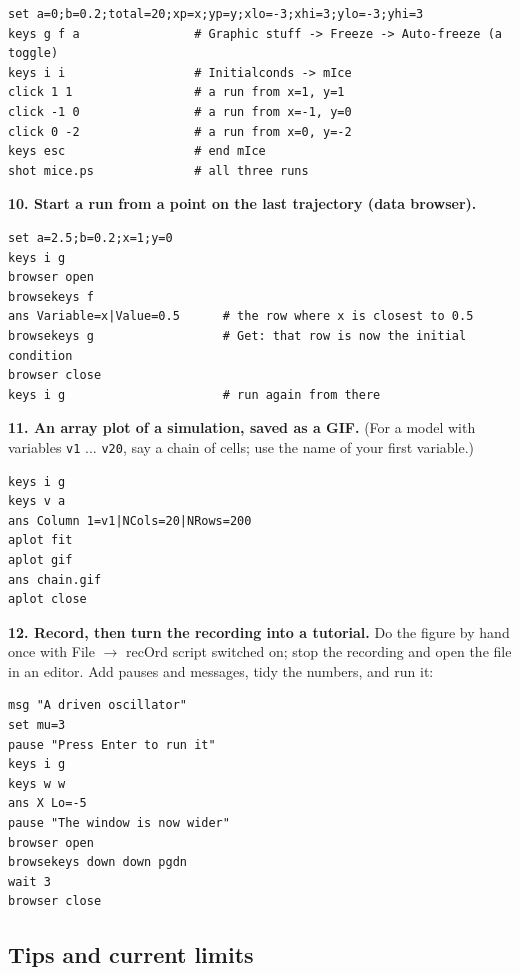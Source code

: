 \documentclass{article}
\begin{document}
{\small\begin{verbatim}
set a=0;b=0.2;total=20;xp=x;yp=y;xlo=-3;xhi=3;ylo=-3;yhi=3
keys g f a                # Graphic stuff -> Freeze -> Auto-freeze (a toggle)
keys i i                  # Initialconds -> mIce
click 1 1                 # a run from x=1, y=1
click -1 0                # a run from x=-1, y=0
click 0 -2                # a run from x=0, y=-2
keys esc                  # end mIce
shot mice.ps              # all three runs
\end{verbatim}}

\textbf{10. Start a run from a point on the last trajectory (data
browser).}

{\small\begin{verbatim}
set a=2.5;b=0.2;x=1;y=0
keys i g
browser open
browsekeys f
ans Variable=x|Value=0.5      # the row where x is closest to 0.5
browsekeys g                  # Get: that row is now the initial condition
browser close
keys i g                      # run again from there
\end{verbatim}}

\textbf{11. An array plot of a simulation, saved as a GIF.}
(For a model with variables \texttt{v1} ... \texttt{v20}, say a
chain of cells; use the name of your first variable.)

{\small\begin{verbatim}
keys i g
keys v a
ans Column 1=v1|NCols=20|NRows=200
aplot fit
aplot gif
ans chain.gif
aplot close
\end{verbatim}}

\textbf{12. Record, then turn the recording into a
tutorial.} Do the figure by hand once with File $\rightarrow$ recOrd script
switched on; stop the recording and open the file in an editor. Add
pauses and messages, tidy the numbers, and run it:

{\small\begin{verbatim}
msg "A driven oscillator"
set mu=3
pause "Press Enter to run it"
keys i g
keys w w
ans X Lo=-5
pause "The window is now wider"
browser open
browsekeys down down pgdn
wait 3
browser close
\end{verbatim}}

\subsection{Tips and current limits}\label{scr:14}
\end{document}
